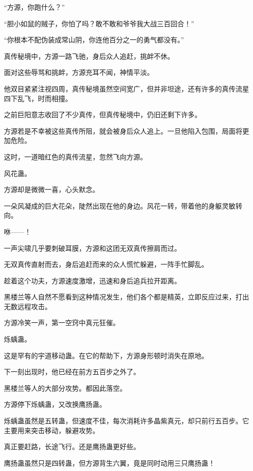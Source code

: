 
\begin{this_body}



“方源，你跑什么？”

“胆小如鼠的贼子，你怕了吗？敢不敢和爷爷我大战三百回合！”

“你根本不配伪装成常山阴，你连他百分之一的勇气都没有。”

真传秘境中，方源一路飞驰，身后众人追赶，挑衅不休。

面对这些辱骂和挑衅，方源充耳不闻，神情平淡。

他双目紧紧注视四周，真传秘境虽然空间宽广，但并非坦途，还有许多的真传流星四下乱飞，时而相撞。

之前巨阳意志收回了不少真传，但真传秘境中，仍旧还剩下许多。

方源若是不幸被这些真传所阻，就会被身后众人追上。一旦他陷入包围，局面将更加危险。

这时，一道暗红色的真传流星，忽然飞向方源。

风花蛊。

方源却是微微一喜，心头默念。

一朵风凝成的巨大花朵，陡然出现在他的身边。风花一转，带着他的身躯灵敏转向。

咻——！

一声尖啸几乎要刺破耳膜，方源和这团无双真传擦肩而过。

无双真传直射而去，身后追赶而来的众人慌忙躲避，一阵手忙脚乱。

趁着这个功夫，方源速度激增，迅速和身后追兵拉开距离。

黑楼兰等人自然不愿看到这种情况发生，他们各个都是精英，立即反应过来，打出无数远程攻击。

方源冷笑一声，第一空窍中真元狂催。

烁蝺蛊。

这是罕有的宇道移动蛊。在它的帮助下，方源身形顿时消失在原地。

下一刻出现时，他已经在前方五百步之外了。

黑楼兰等人的大部分攻势。都因此落空。

方源停下烁蝺蛊，又改换鹰扬蛊。

烁蝺蛊虽然是五转蛊，但速度不佳，每次消耗许多晶紫真元，却只前行五百步。它主要用来突击移动，躲避攻势。

真正要赶路，长途飞行。还是鹰扬蛊更好些。

鹰扬蛊虽然只是四转蛊，但方源背生六翼，竟是同时动用三只鹰扬蛊！


\end{this_body}
